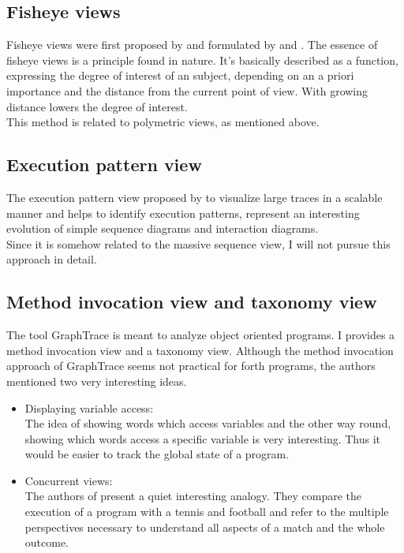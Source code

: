 \subsection*{Fisheye views}
Fisheye views were first proposed by \cite{Furnas:1986:GFV:22627.22342} and formulated by \cite{Storey:1995:GLA:647547.728600} and \cite{Sarkar:1994:GFV:198366.198384}. The essence of fisheye views is a principle found in nature. It's basically described as a function, expressing the degree of interest of an subject, depending on an a priori importance and the distance from the current point of view. With growing distance lowers the degree of interest.
\\
This method is related to polymetric views, as mentioned above.

\subsection*{Execution pattern view}
The execution pattern view proposed by \cite{Pauw98executionpatterns} to visualize large traces in a scalable manner and helps to identify execution patterns, represent an interesting evolution of simple sequence diagrams and interaction diagrams.
\\
Since it is somehow related to the massive sequence view, I will not pursue this approach in detail.

\subsection*{Method invocation view and taxonomy view}
The tool \gls{GraphTrace}\cite{Kleyn:1988:GOS:62084.62101} is meant to analyze object oriented programs. I provides a method invocation view and a taxonomy view. Although the method invocation approach of GraphTrace seems not practical for forth programs, the authors mentioned two very interesting ideas.
\begin{itemize}
\item Displaying variable access:\\
	The idea of showing words which access variables and the other way round, showing which words access a specific variable is very interesting. Thus it would be easier to track the global state of a program.
\item Concurrent views:\\
	The authors of \cite{Kleyn:1988:GOS:62084.62101} present a quiet interesting analogy. They compare the execution of a program with a tennis and football and refer to the multiple perspectives necessary to understand all aspects of a match and the whole outcome.
\end{itemize}

